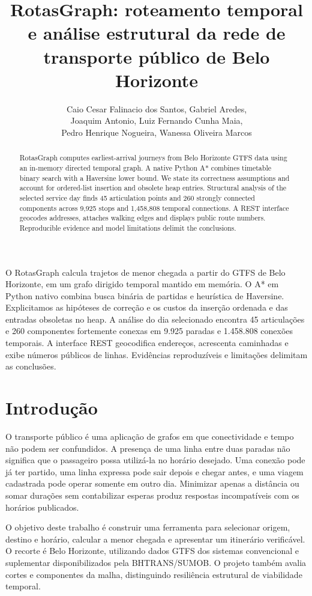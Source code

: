 \documentclass[12pt]{article}
\title{RotasGraph: roteamento temporal e análise estrutural da rede de transporte público de Belo Horizonte}
\author{Caio Cesar Falinacio dos Santos\inst{1}, Gabriel Aredes\inst{1},\\
Joaquim Antonio\inst{1}, Luiz Fernando Cunha Maia\inst{1},\\
Pedro Henrique Nogueira\inst{1}, Wanessa Oliveira Marcos\inst{1}}
\begin{document}
\maketitle
\begin{abstract}
RotasGraph computes earliest-arrival journeys from Belo Horizonte GTFS data using an in-memory directed temporal graph. A native Python A* combines timetable binary search with a Haversine lower bound. We state its correctness assumptions and account for ordered-list insertion and obsolete heap entries. Structural analysis of the selected service day finds 45 articulation points and 260 strongly connected components across 9,925 stops and 1,458,808 temporal connections. A REST interface geocodes addresses, attaches walking edges and displays public route numbers. Reproducible evidence and model limitations delimit the conclusions.
\end{abstract}
\begin{resumo}
O RotasGraph calcula trajetos de menor chegada a partir do GTFS de Belo Horizonte, em um grafo dirigido temporal mantido em memória. O A* em Python nativo combina busca binária de partidas e heurística de Haversine. Explicitamos as hipóteses de correção e os custos da inserção ordenada e das entradas obsoletas no heap. A análise do dia selecionado encontra 45 articulações e 260 componentes fortemente conexas em 9.925 paradas e 1.458.808 conexões temporais. A interface REST geocodifica endereços, acrescenta caminhadas e exibe números públicos de linhas. Evidências reproduzíveis e limitações delimitam as conclusões.
\end{resumo}

\section{Introdução}
O transporte público é uma aplicação de grafos em que conectividade e tempo não podem ser confundidos. A presença de uma linha entre duas paradas não significa que o passageiro possa utilizá-la no horário desejado. Uma conexão pode já ter partido, uma linha expressa pode sair depois e chegar antes, e uma viagem cadastrada pode operar somente em outro dia. Minimizar apenas a distância ou somar durações sem contabilizar esperas produz respostas incompatíveis com os horários publicados.

O objetivo deste trabalho é construir uma ferramenta para selecionar origem, destino e horário, calcular a menor chegada e apresentar um itinerário verificável. O recorte é Belo Horizonte, utilizando dados GTFS dos sistemas convencional e suplementar disponibilizados pela BHTRANS/SUMOB. O projeto também avalia cortes e componentes da malha, distinguindo resiliência estrutural de viabilidade temporal.
\end{document}
